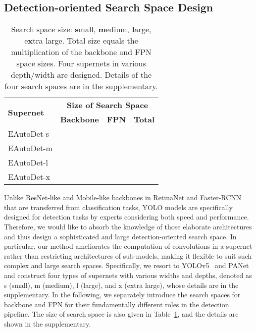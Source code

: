 \documentclass[letterpaper]{article} \usepackage{aaai22}  \usepackage{times}  \usepackage{helvet}  \usepackage{courier}  \usepackage[hyphens]{url}  \usepackage{graphicx} \urlstyle{rm} \def\UrlFont{\rm}  \usepackage{natbib}  \usepackage{caption} \DeclareCaptionStyle{ruled}{labelfont=normalfont,labelsep=colon,strut=off} \frenchspacing  \setlength{\pdfpagewidth}{8.5in}  \setlength{\pdfpageheight}{11in}
\begin{document}
\subsection{Detection-oriented Search Space Design}
\label{sec:search_space}
\begin{table}[tb]
    \centering
\caption{Search space size: \textbf{s}mall, \textbf{m}edium, \textbf{l}arge, e\textbf{x}tra large. Total size equals the multiplication of the backbone and FPN space sizes. Four supernets in various depth/width are designed. Details of the four search spaces are in the supplementary.}
    \label{tab:search_space_size}
    \vspace{-8pt}
\begin{tabular}{l|ccc}
    \toprule
        \multirow{2}{*}{\textbf{Supernet}} & \multicolumn{3}{c}{\textbf{Size of Search Space}}\\
        \cmidrule{2-4}
        &\textbf{Backbone} & \textbf{FPN} & \textbf{Total} \\
    \midrule 
         EAutoDet-s &  &  &  \\
         EAutoDet-m &  &  &  \\
         EAutoDet-l &  &  &  \\
         EAutoDet-x &  &  &  \\
    \bottomrule
    \end{tabular}
\end{table}
Unlike ResNet-like and Mobile-like backbones in RetinaNet and Faster-RCNN that are transferred from classification tasks, YOLO models are specifically designed for detection tasks by experts considering both speed and performance. Therefore, we would like to absorb the knowledge of those elaborate architectures and thus design a sophisticated and large detection-oriented search space. In particular, our method ameliorates the computation of convolutions in a supernet rather than restricting architectures of sub-models, making it flexible to suit such complex and large search spaces. Specifically, we resort to YOLOv5~\cite{yolov5} and PANet~\cite{panet} and construct four types of supernets with various widths and depths, denoted as s (small), m (medium), l (large), and x (extra large), whose details are in the supplementary.
In the following, we separately introduce the search spaces for backbone and FPN for their fundamentally different roles in the detection pipeline.
The size of search space is also given in Table~\ref{tab:search_space_size}, and the details are shown in the supplementary.
\end{document}

